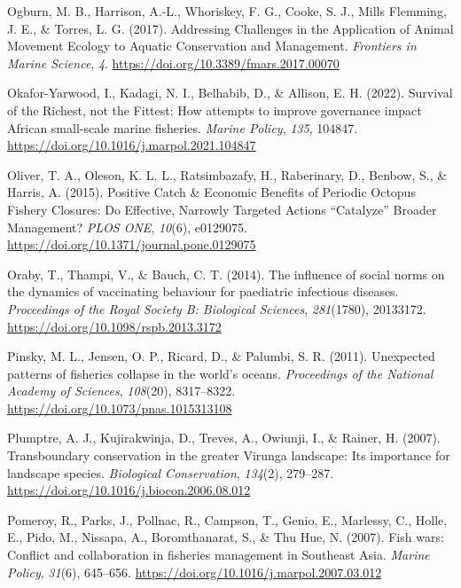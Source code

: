 \documentclass[
]{article}
\newlength{\cslhangindent}
\newlength{\cslentryspacingunit} %
\newenvironment{CSLReferences}[2] %
 {%
  \setlength{\parindent}{0pt}
  \ifodd #1
  \let\oldpar\par
  \def\par{\hangindent=\cslhangindent\oldpar}
  \fi
  \setlength{\parskip}{#2\cslentryspacingunit}
 }%
 {}
\begin{document}
\begin{CSLReferences}{1}{2}
\leavevmode{}%
Ogburn, M. B., Harrison, A.-L., Whoriskey, F. G., Cooke, S. J., Mills Flemming, J. E., \& Torres, L. G. (2017). Addressing {Challenges} in the {Application} of {Animal} {Movement} {Ecology} to {Aquatic} {Conservation} and {Management}. \emph{Frontiers in Marine Science}, \emph{4}. \url{https://doi.org/10.3389/fmars.2017.00070}

\leavevmode{}%
Okafor-Yarwood, I., Kadagi, N. I., Belhabib, D., \& Allison, E. H. (2022). Survival of the {Richest}, not the {Fittest}: {How} attempts to improve governance impact {African} small-scale marine fisheries. \emph{Marine Policy}, \emph{135}, 104847. \url{https://doi.org/10.1016/j.marpol.2021.104847}

\leavevmode{}%
Oliver, T. A., Oleson, K. L. L., Ratsimbazafy, H., Raberinary, D., Benbow, S., \& Harris, A. (2015). Positive {Catch} \& {Economic} {Benefits} of {Periodic} {Octopus} {Fishery} {Closures}: {Do} {Effective}, {Narrowly} {Targeted} {Actions} {``{Catalyze}''} {Broader} {Management}? \emph{PLOS ONE}, \emph{10}(6), e0129075. \url{https://doi.org/10.1371/journal.pone.0129075}

\leavevmode{}%
Oraby, T., Thampi, V., \& Bauch, C. T. (2014). The influence of social norms on the dynamics of vaccinating behaviour for paediatric infectious diseases. \emph{Proceedings of the Royal Society B: Biological Sciences}, \emph{281}(1780), 20133172. \url{https://doi.org/10.1098/rspb.2013.3172}

\leavevmode{}%
Pinsky, M. L., Jensen, O. P., Ricard, D., \& Palumbi, S. R. (2011). Unexpected patterns of fisheries collapse in the world's oceans. \emph{Proceedings of the National Academy of Sciences}, \emph{108}(20), 8317--8322. \url{https://doi.org/10.1073/pnas.1015313108}

\leavevmode{}%
Plumptre, A. J., Kujirakwinja, D., Treves, A., Owiunji, I., \& Rainer, H. (2007). Transboundary conservation in the greater {Virunga} landscape: {Its} importance for landscape species. \emph{Biological Conservation}, \emph{134}(2), 279--287. \url{https://doi.org/10.1016/j.biocon.2006.08.012}

\leavevmode{}%
Pomeroy, R., Parks, J., Pollnac, R., Campson, T., Genio, E., Marlessy, C., Holle, E., Pido, M., Nissapa, A., Boromthanarat, S., \& Thu Hue, N. (2007). Fish wars: {Conflict} and collaboration in fisheries management in {Southeast} {Asia}. \emph{Marine Policy}, \emph{31}(6), 645--656. \url{https://doi.org/10.1016/j.marpol.2007.03.012}


\end{CSLReferences}
\end{document}
